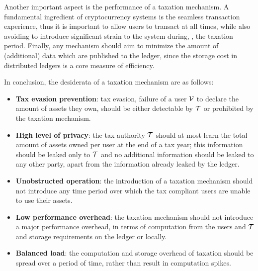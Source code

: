 Another important aspect is the performance of a taxation mechanism.  A
fundamental ingredient of cryptocurrency systems is the seamless transaction
experience, thus it is important to allow users to transact at all times, while
also avoiding to introduce significant strain to the system during, \eg, the
taxation period. Finally, any mechanism should aim to minimize the amount of
(additional) data which are published to the ledger, since the storage cost in
distributed ledgers is a core measure of efficiency.

In conclusion, the desiderata of a taxation mechanism are as follows:
\begin{itemize}
    \item \textbf{Tax evasion prevention}: tax evasion, \ie failure of a user
        $\mathcal{V}$ to declare the amount of assets they own, should be either
        detectable by $\mathcal{T}$ or prohibited by the taxation mechanism.
    \item \textbf{High level of privacy}: the tax authority $\mathcal{T}$ should
        at most learn the total amount of assets owned per user at the end of a
        tax year; this information should be leaked only to $\mathcal{T}$ and no
        additional information should be leaked to any other party, apart from
        the information already leaked by the ledger.
    \item \textbf{Unobstructed operation}: the introduction of a taxation
        mechanism should not introduce any time period over which the tax
        compliant users are unable to use their assets.
    \item \textbf{Low performance overhead}: the taxation mechanism should not
        introduce a major performance overhead, in terms of computation from
        the users and $\mathcal{T}$ and storage requirements on the ledger or
        locally.
    \item \textbf{Balanced load}: the computation and storage overhead of
        taxation should be spread over a period of time, rather than
        result in computation spikes.
\end{itemize}
